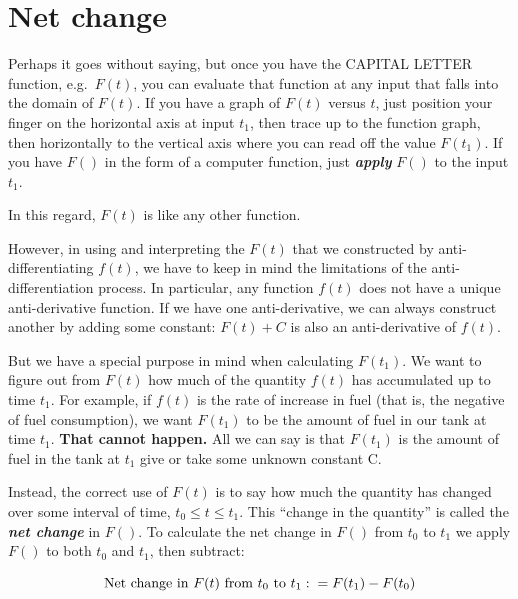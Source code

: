 \documentclass[
  letterpaper,
  DIV=11,
  numbers=noendperiod,
  oneside]{scrreprt}
\begin{document}
\hypertarget{net-change}{%
\section{Net change}\label{net-change}}

Perhaps it goes without saying, but once you have the CAPITAL LETTER
function, e.g.~\(F(t)\), you can evaluate that function at any input
that falls into the domain of \(F(t)\). If you have a graph of \(F(t)\)
versus \(t\), just position your finger on the horizontal axis at input
\(t_1\), then trace up to the function graph, then horizontally to the
vertical axis where you can read off the value \(F(t_1)\). If you have
\(F()\) in the form of a computer function, just \textbf{\emph{apply}}
\(F()\) to the input \(t_1\).

In this regard, \(F(t)\) is like any other function.

However, in using and interpreting the \(F(t)\) that we constructed by
anti-differentiating \(f(t)\), we have to keep in mind the limitations
of the anti-differentiation process. In particular, any function
\(f(t)\) does not have a unique anti-derivative function. If we have one
anti-derivative, we can always construct another by adding some
constant: \(F(t) + C\) is also an anti-derivative of \(f(t)\).

But we have a special purpose in mind when calculating \(F(t_1)\). We
want to figure out from \(F(t)\) how much of the quantity \(f(t)\) has
accumulated up to time \(t_1\). For example, if \(f(t)\) is the rate of
increase in fuel (that is, the negative of fuel consumption), we want
\(F(t_1)\) to be the amount of fuel in our tank at time \(t_1\).
\textbf{That cannot happen.} All we can say is that \(F(t_1)\) is the
amount of fuel in the tank at \(t_1\) give or take some unknown constant
C.

Instead, the correct use of \(F(t)\) is to say how much the quantity has
changed over some interval of time, \(t_0 \leq t \leq t_1\). This
``change in the quantity'' is called the \textbf{\emph{net change}} in
\(F()\). To calculate the net change in \(F()\) from \(t_0\) to \(t_1\)
we apply \(F()\) to both \(t_0\) and \(t_1\), then subtract:

\[\text{Net change in}\ F(t) \ \text{from}\ t_0 \ \text{to}\ t_1 :\\= F(t_1) - F(t_0)\]
\end{document}
